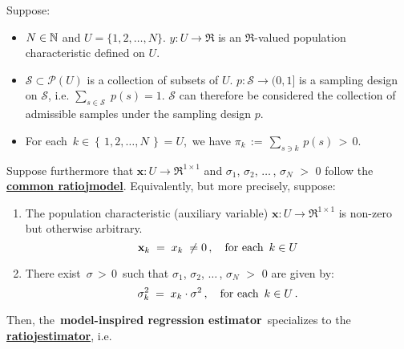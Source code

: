 \begin{corollary}\label{commonRatioYieldsRatioEstimator}
\mbox{}
\vskip 0.05cm
\noindent
Suppose:
\begin{itemize}
\item
	$N \in \mathbb{N}$ and $U = \{1,2,\ldots,N\}$.
	\vskip 0.05cm
	$y : U \longrightarrow \Re$ is an $\Re$-valued population characteristic defined on $U$.
\item
	$\mathcal{S} \subset \mathcal{P}(U)$ is a collection of subsets of $U$.
	$p : \mathcal{S} \longrightarrow (0,1]$ is a sampling design on $\mathcal{S}$,
	i.e. $\underset{s\in\mathcal{S}}{\sum}\;p(s) = 1$.
	\vskip 0.05cm
	$\mathcal{S}$ can therefore be considered the collection of admissible samples under the sampling design $p$.
\item
	For each \,$k \in \left\{\,1,2,\ldots,N\,\right\} = U$,\, we have
	$\pi_{k} \,:=\, \underset{s \ni k}{\sum}\,p(s) \,>\, 0$.
\end{itemize}
Suppose furthermore that
$\mathbf{x} : U \longrightarrow \Re^{1 \times 1}$ and
$\sigma_{1}$, $\sigma_{2}$, $\ldots$\,, $\sigma_{N}$ $>$ $0$
follow the \,\underline{\textbf{{\color{red}common ratio}{\color{white}j}model}}.
\renewcommand{\theenumi}{\alph{enumi}}
\renewcommand{\labelenumi}{\textnormal{(\theenumi)}$\;\;$}
\vskip 0.1cm
\noindent
Equivalently, but more precisely, suppose:
\begin{enumerate}
\item \vskip -0.10cm
	The population characteristic (auxiliary variable)
	$\mathbf{x} : U \longrightarrow \Re^{1 \times 1}$ is non-zero but otherwise arbitrary.
	\begin{equation*}
	\mathbf{x}_{k}
		\; = \; x_{k}
		\; \neq 0\,,
	\quad\textnormal{for each \,$k \in U$}
	\end{equation*}
\item
	There exist \,$\sigma \,>\, 0$\, such that
	$\sigma_{1}$, $\sigma_{2}$, $\ldots$\,, $\sigma_{N}$ $>$ $0$ are given by:
	\begin{equation*}
	\sigma_{k}^{2} \; = \; x_{k} \cdot \sigma^{2}\,,
	\quad\textnormal{for each \,$k \in U$}\,.
	\end{equation*}
\end{enumerate}
\renewcommand{\theenumi}{\roman{enumi}}
\renewcommand{\labelenumi}{\textnormal{(\theenumi)}$\;\;$}
Then, the \,\textbf{model-inspired regression estimator}\,
specializes to the \,\underline{\textbf{{\color{red}ratio}{\color{white}j}estimator}}, i.e.

\end{corollary}
